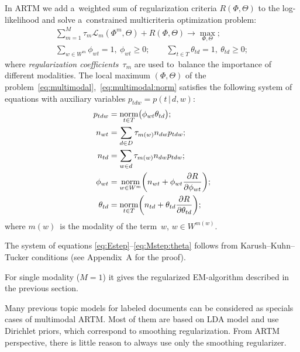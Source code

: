 \documentclass{sig-alternate-2013}
\newcommand{\norm}{\mathop{\rm norm}\limits}
\newcommand{\cond}{\mspace{3mu}{|}\mspace{3mu}}
\newcommand{\cL}{\mathscr{L}}
\begin{document}
In ARTM we add a~weighted sum of regularization criteria $R(\Phi,\Theta)$ to the log-likelihood
and solve a~constrained multicriteria optimization problem:
\begin{gather}
\label{eq:multimodal}
    \sum_{m=1}^M \tau_m \cL_m (\Phi^m,\Theta)
    + R(\Phi,\Theta)
    \to \max_{\Phi,\Theta};
\\\label{eq:multimodal:norm}
    \sum_{w\in W^m}\!\!\! \phi_{wt} = 1,~
    \phi_{wt}\geq 0;
    \qquad
    \sum_{t\in T} \theta_{td} = 1,~
    \theta_{td}\geq 0;
\end{gather}
where \emph{regularization coefficients}~$\tau_m$
are used to~balance the importance of different modalities.
The local maximum $(\Phi,\Theta)$
of the problem~\eqref{eq:multimodal},~\eqref{eq:multimodal:norm}
satisfies the following system of equations
with auxiliary variables $p_{tdw} = p(t\cond d,w)$:
\begin{align}
    \label{eq:Estep}
    p_{tdw} &= \norm_{t\in T} \bigl(\phi_{wt}\theta_{td}\bigr);
\\\notag
    n_{wt} &= \sum_{d\in D} \tau_{m(w)} n_{dw} p_{tdw};
\\\notag
    n_{td} &= \sum_{w\in d} \tau_{m(w)} n_{dw} p_{tdw};
\\
    \label{eq:Mstep:phi}
    \phi_{wt} &= \norm_{w\in W^m}
        \biggl(
            n_{wt} + \phi_{wt} \frac{\partial R}{\partial \phi_{wt}}
        \biggr);
\\
    \label{eq:Mstep:theta}
    \theta_{td} &= \norm_{t\in T}
        \biggl(
            n_{td} + \theta_{td} \frac{\partial R}{\partial \theta_{td}}
        \biggr);
\end{align}
where $m(w)$~is the modality of the term~$w$,\; $w\in W^{m(w)}$.

The system of equations \eqref{eq:Estep}--\eqref{eq:Mstep:theta}
follows from Karush--Kuhn--Tucker conditions (see Appendix~A for the proof).

For single modality (${M=1}$) it gives the regularized EM-algorithm
described in the previous section.

Many previous topic models for labeled documents
can be considered as specials cases of multimodal ARTM.
Most of them are based on LDA model and use Dirichlet priors,
which correspond to smoothing regularization.
From ARTM perspective,
there is little reason to always use only the smoothing regularizer.
\end{document}
